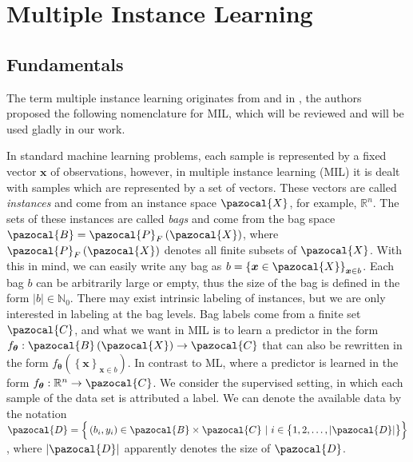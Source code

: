 \chapter{Multiple Instance Learning}
\section{Fundamentals}
The term multiple instance learning originates from \cite{MILfirstly} and in \cite{mandlik}, the authors proposed the following nomenclature for MIL, which will be reviewed and will be used gladly in our work. 

In standard machine learning problems, each sample is represented by a fixed vector $\boldsymbol{x}$ of observations, however, in multiple instance learning (MIL) it is dealt with samples which are represented by a set of vectors. These vectors are called \emph{instances} and come from an instance space $\pazocal{X}$, for example, $\mathbb{R}^n$. The sets of these instances are called \emph{bags} and come from the bag space $\pazocal{B} = \pazocal{P}_F\left(\pazocal{X}\right)$, where $\pazocal{P}_F\left(\pazocal{X}\right)$ denotes all finite subsets of $\pazocal{X}$. With this in mind, we can easily write any bag as $b = \left\lbrace \boldsymbol{x} \in  \pazocal{X} \right\rbrace_{\boldsymbol{x} \in b}$. Each bag $b$ can be arbitrarily large or empty, thus the size of the bag is defined in the form $\vert b\vert \in \mathbb{N}_0$. There may exist intrinsic labeling of instances, but we are only interested in labeling at the bag levels. Bag labels come from a finite set $\pazocal{C}$, and what we want in MIL is to learn a predictor in the form $f_{\boldsymbol{\theta}}: \pazocal{B}\left(\pazocal{X}\right) \rightarrow \pazocal{C}$ that can also be rewritten in the form $f_{\boldsymbol{\theta}}\left(\left\lbrace \boldsymbol{x}\right\rbrace_{\boldsymbol{x}\in b}\right)$. In contrast to ML, where a predictor is learned in the form  $f_{\boldsymbol{\theta}}: \mathbb{R}^n \rightarrow \pazocal{C}$.  We consider the supervised setting, in which each sample of the data set is attributed a label. We can denote the available data by the notation $\pazocal{D} = \Big\lbrace \left(b_i, y_i\right) \in \pazocal{B}\times\pazocal{C} \ | \ i \in \big\lbrace 1,2,\dots,\vert \pazocal{D} \vert \big\rbrace \Big\rbrace$, where $\vert \pazocal{D} \vert$ apparently denotes the size of $\pazocal{D}$. 
